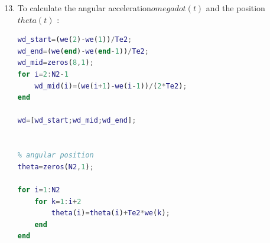 \documentclass[a4paper,12pt]{article}
\begin{document}
\begin{enumerate}[label={\color{blue}\arabic*)}]
    \setcounter{enumi}{12}

    \item
    To calculate the angular acceleration\(omega dot(t)\) and the position \(theta(t)\) :
     \begin{lstlisting}[style=Matlab-editor,language=Matlab, basicstyle=\small\ttfamily]
% angular acceleration
wd_start=(we(2)-we(1))/Te2;
wd_end=(we(end)-we(end-1))/Te2;
wd_mid=zeros(8,1);
for i=2:N2-1
    wd_mid(i)=(we(i+1)-we(i-1))/(2*Te2);
end

wd=[wd_start;wd_mid;wd_end];


% angular position
theta=zeros(N2,1);

for i=1:N2
    for k=1:i+2
        theta(i)=theta(i)+Te2*we(k);
    end
end
        \end{lstlisting}


\end{enumerate}
\end{document}
